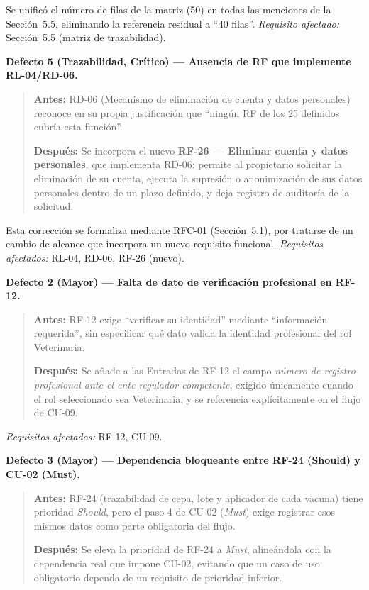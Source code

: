 \documentclass[journal,onecolumn]{IEEEtran}
\begin{document}
Se unificó el número de filas de la matriz (50) en todas las menciones de la Sección~5.5, eliminando la referencia residual a ``40 filas''. \textit{Requisito afectado:} Sección~5.5 (matriz de trazabilidad).

\vspace{6pt}
\textbf{Defecto 5 (Trazabilidad, Crítico) --- Ausencia de RF que implemente RL-04/RD-06.}

\begin{quote}
	\textbf{Antes:} RD-06 (Mecanismo de eliminación de cuenta y datos personales) reconoce en su propia justificación que ``ningún RF de los 25 definidos cubría esta función''.
	
	\textbf{Después:} Se incorpora el nuevo \textbf{RF-26 --- Eliminar cuenta y datos personales}, que implementa RD-06: permite al propietario solicitar la eliminación de su cuenta, ejecuta la supresión o anonimización de sus datos personales dentro de un plazo definido, y deja registro de auditoría de la solicitud.
\end{quote}

Esta corrección se formaliza mediante RFC-01 (Sección~5.1), por tratarse de un cambio de alcance que incorpora un nuevo requisito funcional. \textit{Requisitos afectados:} RL-04, RD-06, RF-26 (nuevo).

\vspace{6pt}
\textbf{Defecto 2 (Mayor) --- Falta de dato de verificación profesional en RF-12.}

\begin{quote}
	\textbf{Antes:} RF-12 exige ``verificar su identidad'' mediante ``información requerida'', sin especificar qué dato valida la identidad profesional del rol Veterinaria.
	
	\textbf{Después:} Se añade a las Entradas de RF-12 el campo \textit{número de registro profesional ante el ente regulador competente}, exigido únicamente cuando el rol seleccionado sea Veterinaria, y se referencia explícitamente en el flujo de CU-09.
\end{quote}

\textit{Requisitos afectados:} RF-12, CU-09.

\vspace{6pt}
\textbf{Defecto 3 (Mayor) --- Dependencia bloqueante entre RF-24 (Should) y CU-02 (Must).}

\begin{quote}
	\textbf{Antes:} RF-24 (trazabilidad de cepa, lote y aplicador de cada vacuna) tiene prioridad \textit{Should}, pero el paso 4 de CU-02 (\textit{Must}) exige registrar esos mismos datos como parte obligatoria del flujo.
	
	\textbf{Después:} Se eleva la prioridad de RF-24 a \textit{Must}, alineándola con la dependencia real que impone CU-02, evitando que un caso de uso obligatorio dependa de un requisito de prioridad inferior.
\end{quote}
\end{document}
